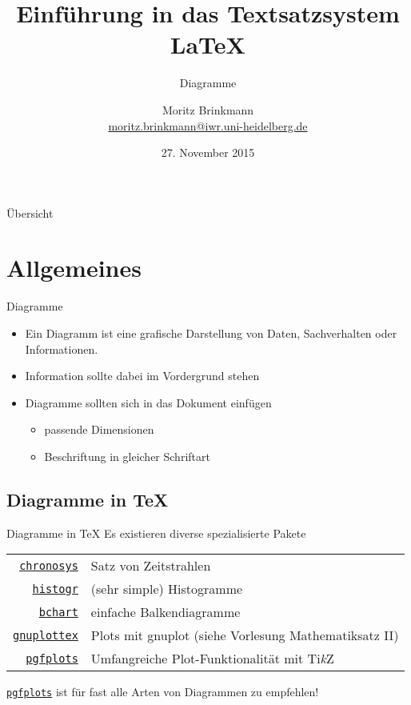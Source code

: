 \documentclass{beamer}
\title{Einführung in das Textsatzsystem \LaTeX{}}
\subtitle{Diagramme}
\author[Mo]{Moritz Brinkmann\\\url{moritz.brinkmann@iwr.uni-heidelberg.de}}
\date{27. November 2015}
\newcommand{\pkg}[1]{\href{http://ctan.org/pkg/#1}{\alert{\texttt{#1}}}}
\newcommand{\TikZ}{Ti\textit{k}Z}
\begin{document}
\MakeShortVerb{|}

\frame{\titlepage}

\begin{frame}{Übersicht}
	\tableofcontents
\end{frame}

\section{Allgemeines}
\begin{frame}{Diagramme}
\begin{itemize}
\item Ein Diagramm ist eine grafische Darstellung von Daten, Sachverhalten oder Informationen.
\item Information sollte dabei im Vordergrund stehen
\item Diagramme sollten sich in das Dokument einfügen
\begin{itemize}
\item passende Dimensionen
\item Beschriftung in gleicher Schriftart
\end{itemize}
\end{itemize}
\end{frame}

\subsection{Diagramme in \TeX}
\begin{frame}{Diagramme in \TeX}
Es existieren diverse spezialisierte Pakete
\begin{tabular}{rl}
\pkg{chronosys} & Satz von Zeitstrahlen\\
\pkg{histogr} & (sehr simple) Histogramme\\
\pkg{bchart} & einfache Balkendiagramme\\
\pkg{gnuplottex} & Plots mit gnuplot (siehe Vorlesung Mathematiksatz II)\\
\pkg{pgfplots} & Umfangreiche Plot-Funktionalität mit \TikZ
\end{tabular}
\vfill
\pause
\pkg{pgfplots} ist für fast alle Arten von Diagrammen zu empfehlen!
\end{frame}
\end{document}
